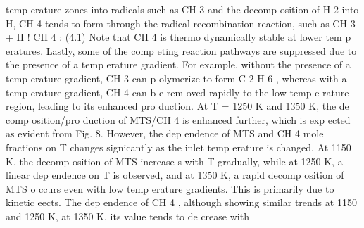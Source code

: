 \documentclass[10pt, letterpaper]{article}
\begin{document}
temp erature zones into radicals such as CH
3
and the decomp osition of H
2
into H, CH
4
tends to form through
the radical recombination reaction, such as
CH
3
+ H
!
CH
4
:
(4.1)
Note that CH
4
is thermo dynamically stable at lower tem p eratures. Lastly, some of the comp eting reaction
pathways are suppressed due to the presence of a temp erature gradient. For example, without the presence
of a temp erature gradient, CH
3
can p olymerize to form C
2
H
6
, whereas with a temp erature gradient, CH
4
can b e rem oved rapidly to the low temp e rature region, leading to its enhanced pro duction.
At
T
= 1250 K and 1350 K, the de comp osition/pro duction of MTS/CH
4
is enhanced further, which is
exp ected as evident from Fig. 8. However, the dep endence of MTS and CH
4
mole fractions on 
T
changes
signicantly as the inlet temp erature is changed. At 1150 K, the decomp osition of MTS increase s with
T
gradually, while at 1250 K, a linear dep endence on
T
is observed, and at 1350 K, a rapid decomp osition of
MTS o ccurs even with low temp erature gradients. This is primarily due to kinetic eects. The dep endence
of CH
4
, although showing similar trends at 1150 and 1250 K, at 1350 K, its value tends to de crease with
\end{document}
